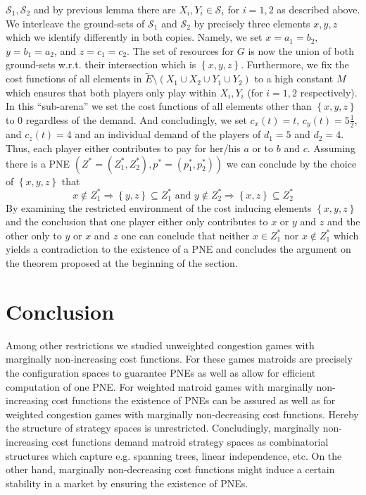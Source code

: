 \documentclass{scrartcl}
\theoremstyle{nonumberplain}
\newcommand{\tupel}[1]{\left(#1\right)}
\newcommand{\set}[1]{\left\{#1\right\}}
\begin{document}
$\mathcal{S}_{1},\mathcal{S}_{2}$ and by previous lemma there are
$X_{i}, Y_{i}\in\mathcal{S}_{i}$ for $i = 1,2$ as described above. We
interleave the ground-sets of $\mathcal{S}_{1}$ and $\mathcal{S}_{2}$ by
precisely three elements $x,y,z$ which we identify differently in both copies.
Namely, we set $x = a_{1} = b_{2}$, $y = b_{1} = a_{2}$, and
$z = c_{1} = c_{2}$. The set of resources for $G$ is now the union of both
ground-sets w.r.t. their intersection which is $\set{x,y,z}$. Furthermore, we
fix the cost functions of all elements in
$\tilde{E}\setminus(X_{1}\cup X_{2}\cup Y_{1}\cup Y_{2})$ to a high constant
$M$ which ensures that both players only play within $X_{i},
Y_{i}$ (for $i = 1,2$ respectively). In this \enquote{sub-arena} we set the
cost functions of all elements other than $\set{x,y,z}$ to $0$ regardless of
the demand. And concludingly, we set $c_{x}(t) = t$, $c_{y}(t) = 5\frac{1}{2}$,
and $c_{z}(t) = 4$ and an individual demand of the players of $d_{1} = 5$ and
$d_{2} = 4$. Thus, each player either contributes to pay for her/his $a$ or
to $b$ and $c$. Assuming there is a PNE
$\tupel{Z^{\ast} = \tupel{Z_{1}^{\ast}, Z_{2}^{\ast}},
p^{\ast} = \tupel{p_{1}^{\ast}, p_{2}^{\ast}}}$ we can conclude by the choice
of $\set{x,y,z}$ that
\begin{equation*}
  x\notin Z_{1}^{\ast}\Rightarrow \set{y,z}\subseteq Z_{1}^{\ast} \text{ and }
  y\notin Z_{2}^{\ast}\Rightarrow \set{x,z}\subseteq Z_{2}^{\ast}
\end{equation*}
By examining the restricted environment of the cost inducing elements
$\set{x,y,z}$ and the conclusion that one player either only contributes to $x$
or $y$ and $z$ and the other only to $y$ or $x$ and $z$ one can conclude that
neither $x\in Z_{1}^{\ast}$ nor $x\notin Z_{1}^{\ast}$ which yields a
contradiction to the existence of a PNE and concludes the argument on the
theorem proposed at the beginning of the section.

\section{Conclusion}
Among other restrictions we studied unweighted congestion games with marginally
non-increasing cost functions. For these games matroids are precisely the
configuration spaces to guarantee PNEs as well as allow for efficient
computation of one PNE. For weighted matroid games with marginally
non-increasing cost functions the existence of PNEs can be assured as well as
for weighted congestion games with marginally non-decreasing cost functions.
Hereby the structure of strategy spaces is unrestricted.
Concludingly, marginally non-increasing cost functions demand matroid strategy
spaces as combinatorial structures which capture e.g. spanning trees, linear
independence, etc. On the other hand, marginally non-decreasing cost functions
might induce a certain stability in a market by ensuring the existence of PNEs.

\printbibliography

\todos
\end{document}
